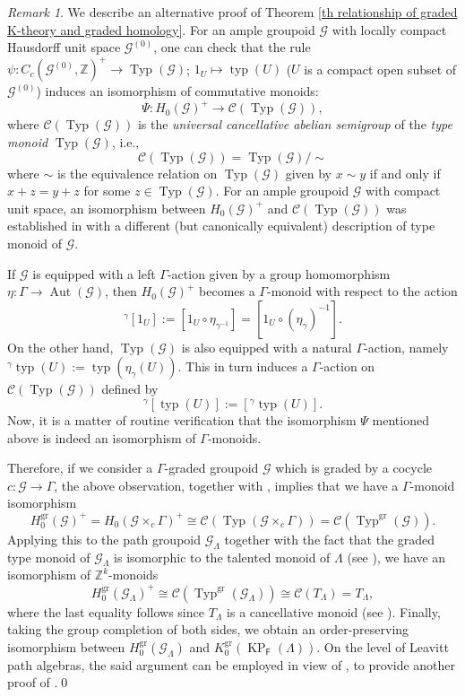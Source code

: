 \documentclass[12pt]{amsart}
\newcommand{\KP}{\operatorname{KP}}
\theoremstyle{definition}
\theoremstyle{remark}
\newtheorem{rmk}[thm]{Remark}
\newcommand{\Aut}{\operatorname{Aut}}
\newcommand{\Typ}{\operatorname{Typ}}
\newcommand{\typ}{\operatorname{typ}}
\newcommand{\gr}{\operatorname{gr}}
\begin{document}
\begin{rmk}\label{rem alternative proof incorporating type semigroup}
We describe an alternative proof of Theorem \ref{th relationship of graded K-theory and graded homology}. For an ample groupoid $\mathcal{G}$ with locally compact Hausdorff unit space $\mathcal{G}^{(0)}$, one can check that the rule $\psi: C_c(\mathcal{G}^{(0)},\mathbb{Z})^+\longrightarrow \Typ(\mathcal{G})$; $1_{U}\longmapsto \typ(U)$ ($U$ is a compact open subset of $\mathcal{G}^{(0)}$) induces an isomorphism of commutative monoids: \[\Psi:H_0(\mathcal{G})^+\longrightarrow \mathcal{C}(\Typ(\mathcal{G})),\] where $\mathcal{C}(\Typ(\mathcal{G}))$ is the \emph{universal cancellative abelian semigroup} \cite{ABBL} of the \emph{type monoid} $\Typ(\mathcal{G})$, i.e., \[\mathcal{C}(\Typ(\mathcal{G}))=\Typ(\mathcal{G})/\sim\] where $\sim$ is the equivalence relation on $\Typ(\mathcal{G})$ given by $x\sim y$ if and only if $x+z=y+z$ for some $z\in \Typ(\mathcal{G})$. For an ample groupoid $\mathcal{G}$ with compact unit space, an isomorphism between $H_0(\mathcal{G})^+$ and $\mathcal{C}(\Typ(\mathcal{G}))$ was established in \cite[Proposition 1.6]{ABBL} with a different (but canonically equivalent) description of type monoid of $\mathcal{G}$.

If $\mathcal{G}$ is equipped with a left $\Gamma$-action given by a group homomorphism $\eta:\Gamma\longrightarrow \Aut(\mathcal{G})$, then $H_0(\mathcal{G})^+$ becomes a $\Gamma$-monoid with respect to the action \[^\gamma [1_U]:=[1_U\circ \eta_{\gamma^{-1}}]=[1_U\circ (\eta_\gamma)^{-1}].\] On the other hand, $\Typ(\mathcal{G})$ is also equipped with a natural $\Gamma$-action, namely $^\gamma \typ(U):=\typ(\eta_\gamma(U))$. This in turn induces a $\Gamma$-action on $\mathcal{C}(\Typ(\mathcal{G}))$ defined by \[^\gamma [\typ(U)]:=[^\gamma \typ(U)].\] Now, it is a matter of routine verification that the isomorphism $\Psi$ mentioned above is indeed an isomorphism of $\Gamma$-monoids. 

Therefore, if we consider a $\Gamma$-graded groupoid $\mathcal{G}$ which is graded by a cocycle $c:\mathcal{G}\longrightarrow \Gamma$, the above observation, together with \cite[Definition 3.3]{Cordeiro}, implies that we have a $\Gamma$-monoid isomorphism \[H_0^{\gr}(\mathcal{G})^+=H_0(\mathcal{G}\times_c \Gamma)^+\cong \mathcal{C}(\Typ(\mathcal{G}\times_c \Gamma))=\mathcal{C}(\Typ^{\gr}(\mathcal{G})).\] Applying this to the path groupoid $\mathcal{G}_\Lambda$ together with the fact that the graded type monoid of $\mathcal{G}_\Lambda$ is isomorphic to the talented monoid of $\Lambda$ (see \cite[Theorem 3.18]{HMPS}), we have an isomorphism of $\mathbb{Z}^k$-monoids \[H_0^{\gr}(\mathcal{G}_\Lambda)^+\cong \mathcal{C}(\Typ^{\gr}(\mathcal{G}_\Lambda))\cong\mathcal{C}(T_\Lambda)=T_\Lambda,\] where the last equality follows since $T_\Lambda$ is a cancellative monoid (see \cite[Proposition 3.14 $(ii)$]{HMPS}). Finally, taking the group completion of both sides, we obtain an order-preserving isomorphism between $H_0^{\gr}(\mathcal{G}_\Lambda)$ and $K_0^{\gr}(\KP_\mathsf{F}(\Lambda))$. On the level of Leavitt path algebras, the said argument can be employed in view of \cite[Lemma 3.6]{Cordeiro}, to provide another proof of \cite[Theorem 6.6]{H-Li}.\qed
\end{rmk}
\end{document}
